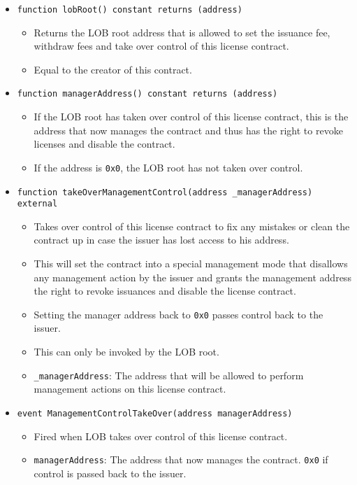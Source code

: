 \documentclass[a4paper]{article}
\begin{document}
\begin{itemize}
  \item \texttt{function lobRoot() constant returns (address)}
  \begin{itemize}
    \item Returns the LOB root address that is allowed to set the issuance fee, withdraw fees and take over control of this license contract. 
    \item Equal to the creator of this contract.
  \end{itemize}
  
  \item \texttt{function managerAddress() constant returns (address)}
  \begin{itemize}
    \item If the LOB root has taken over control of this license contract, this is the address that now manages the contract and thus has the right to revoke licenses and disable the contract.
    \item If the address is \texttt{0x0}, the LOB root has not taken over control.
  \end{itemize}
  
  \item \texttt{function takeOverManagementControl(address \_managerAddress) external}
  \begin{itemize}
    \item Takes over control of this license contract to fix any mistakes or clean the contract up in case the issuer has lost access to his address. 
    \item This will set the contract into a special management mode that disallows any management action by the issuer and grants the management address the right to revoke issuances and disable the license contract.
    \item Setting the manager address back to \texttt{0x0} passes control back to the issuer.
    \item This can only be invoked by the LOB root.
    \item \texttt{\_managerAddress}: The address that will be allowed to perform management actions on this license contract.
  \end{itemize}
  
  \item \texttt{event ManagementControlTakeOver(address managerAddress)}
  \begin{itemize}
    \item Fired when LOB takes over control of this license contract.
    \item \texttt{managerAddress}: The address that now manages the contract. \texttt{0x0} if control is passed back to the issuer.
  \end{itemize}
  

\end{itemize}
\end{document}
